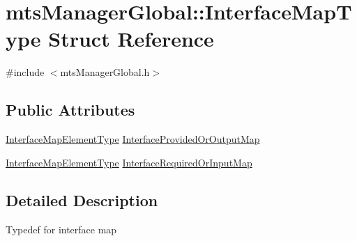 \hypertarget{structmts_manager_global_1_1_interface_map_type}{\section{mts\-Manager\-Global\-:\-:Interface\-Map\-Type Struct Reference}
\label{structmts_manager_global_1_1_interface_map_type}
}


{\ttfamily \#include $<$mts\-Manager\-Global.\-h$>$}

\subsection*{Public Attributes}
\begin{DoxyCompactItemize}
\item 
\hyperlink{classmts_manager_global_a3449158e2432ced5a21d4853a2ca59b6}{Interface\-Map\-Element\-Type} \hyperlink{structmts_manager_global_1_1_interface_map_type_ac18ba96691e610718e7723deaf599f5a}{Interface\-Provided\-Or\-Output\-Map}
\item 
\hyperlink{classmts_manager_global_a3449158e2432ced5a21d4853a2ca59b6}{Interface\-Map\-Element\-Type} \hyperlink{structmts_manager_global_1_1_interface_map_type_a455b80cd0b508438ad1ddba4eabf341c}{Interface\-Required\-Or\-Input\-Map}
\end{DoxyCompactItemize}


\subsection{Detailed Description}
Typedef for interface map 

